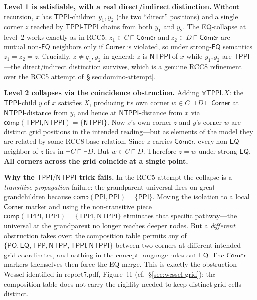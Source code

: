 \documentclass[
]{ceurart}
\theoremstyle{definition}
\newcommand{\PO}{\ensuremath{\mathsf{PO}}}
\newcommand{\EQ}{\ensuremath{\mathsf{EQ}}}
\newcommand{\PPI}{\ensuremath{\mathsf{PPI}}}
\newcommand{\TPP}{\ensuremath{\mathsf{TPP}}}
\newcommand{\NTPP}{\ensuremath{\mathsf{NTPP}}}
\newcommand{\TPPI}{\ensuremath{\mathsf{TPPI}}}
\newcommand{\NTPPI}{\ensuremath{\mathsf{NTPPI}}}
\newcommand{\comp}{\ensuremath{\mathsf{comp}}}
\begin{document}
\medskip\noindent\textbf{Level 1 is satisfiable, with a real
direct/indirect distinction.} Without recursion, $x$ has
$\TPPI$-children $y_1, y_2$ (the two ``direct'' positions) and a
single corner $z$ reached by $\TPPI$-$\TPPI$ chains from both
$y_1$ and $y_2$.  The EQ-collapse at level~2 works exactly as
in RCC5: $z_1 \in C \sqcap \textsf{Corner}$ and $z_2 \in D \sqcap
\textsf{Corner}$ are mutual non-$\EQ$ neighbors only if
$\textsf{Corner}$ is violated, so under strong-$\EQ$ semantics
$z_1 = z_2 = z$.  Crucially, $z \neq y_1, y_2$ in general: $z$ is
$\NTPPI$ of $x$ while $y_1, y_2$ are $\TPPI$---the direct/indirect
distinction survives, which is a genuine RCC8 refinement over the
RCC5 attempt of~\S\ref{sec:domino-attempt}.

\medskip\noindent\textbf{Level 2 collapses via the coincidence
obstruction.} Adding $\forall\TPPI.X$: the $\TPPI$-child $y$ of
$x$ satisfies $X$, producing its own corner $w \in C \sqcap D
\sqcap \textsf{Corner}$ at $\NTPPI$-distance from $y$, and hence
at $\NTPPI$-distance from $x$ via
$\comp(\TPPI, \NTPPI) = \{\NTPPI\}$.  Now $x$'s own corner $z$ and
$y$'s corner $w$ are distinct grid positions in the intended
reading---but as elements of the model they are related by some
RCC8 base relation.  Since $z$ carries $\textsf{Corner}$, every
non-$\EQ$ neighbor of $z$ lies in $\neg C \sqcap \neg D$.  But
$w \in C \sqcap D$.  Therefore $z = w$ under strong-$\EQ$.
\textbf{All corners across the grid coincide at a single point.}

\medskip\noindent\textbf{Why the $\TPPI/\NTPPI$ trick fails.} In
the RCC5 attempt the collapse is a \emph{transitive-propagation}
failure: the grandparent universal fires on great-grandchildren
because $\comp(\PPI,\PPI) = \{\PPI\}$.  Moving the isolation to a
local $\textsf{Corner}$ marker and using the non-transitive piece
$\comp(\TPPI,\TPPI) = \{\TPPI, \NTPPI\}$ eliminates that specific
pathway---the universal at the grandparent no longer reaches
deeper nodes.  But a \emph{different} obstruction takes over: the
composition table permits any of
$\{\PO, \EQ, \TPP, \NTPP, \TPPI, \NTPPI\}$ between two corners at
different intended grid coordinates, and nothing in the concept
language rules out $\EQ$.  The $\textsf{Corner}$ markers themselves
then force the EQ-merge.  This is exactly the obstruction Wessel
identified in report7.pdf, Figure~11 (cf.~\S\ref{sec:wessel-grid}):
the composition table does not carry the rigidity needed to keep
distinct grid cells distinct.
\end{document}
